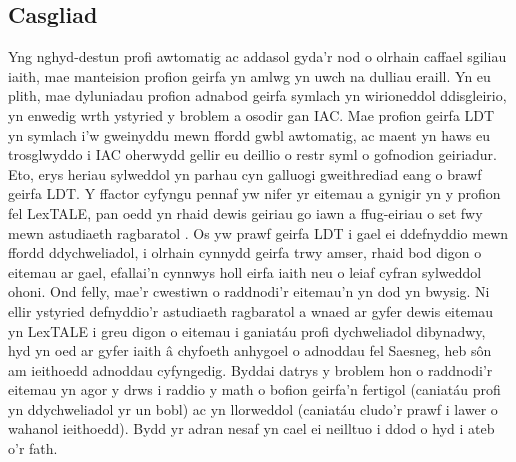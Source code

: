\subsection{Casgliad}
Yng nghyd-destun profi awtomatig ac addasol gyda'r nod o olrhain caffael sgiliau iaith, mae manteision profion geirfa yn amlwg yn uwch na dulliau eraill. Yn eu plith, mae dyluniadau profion adnabod geirfa symlach yn wirioneddol ddisgleirio, yn enwedig wrth ystyried y broblem a osodir gan IAC\@. Mae profion geirfa LDT yn symlach i'w gweinyddu mewn ffordd gwbl awtomatig, ac maent yn haws eu trosglwyddo i IAC oherwydd gellir eu deillio o restr syml o gofnodion geiriadur. Eto, erys heriau sylweddol yn parhau cyn galluogi gweithrediad eang o brawf geirfa LDT\@. Y ffactor cyfyngu pennaf yw nifer yr eitemau a gynigir yn y profion fel LexTALE, pan oedd yn rhaid dewis geiriau go iawn a ffug-eiriau o set fwy mewn astudiaeth ragbaratol \parencite{lemhofer_introducing_2012}. Os yw prawf geirfa LDT i gael ei ddefnyddio mewn ffordd ddychweliadol, i olrhain cynnydd geirfa trwy amser, rhaid bod digon o eitemau ar gael, efallai'n cynnwys holl eirfa iaith neu o leiaf cyfran sylweddol ohoni. Ond felly, mae'r cwestiwn o raddnodi'r eitemau'n yn dod yn bwysig. Ni ellir ystyried defnyddio’r astudiaeth ragbaratol a wnaed ar gyfer dewis eitemau yn LexTALE i greu digon o eitemau i ganiatáu profi dychweliadol dibynadwy, hyd yn oed ar gyfer iaith â chyfoeth anhygoel o adnoddau fel Saesneg, heb sôn am ieithoedd adnoddau cyfyngedig. Byddai datrys y broblem hon o raddnodi'r eitemau yn agor y drws i raddio y math o bofion geirfa'n fertigol (caniatáu profi yn ddychweliadol yr un bobl) ac yn llorweddol (caniatáu cludo'r prawf i lawer o wahanol ieithoedd). Bydd yr adran nesaf yn cael ei neilltuo i ddod o hyd i ateb o'r fath.

